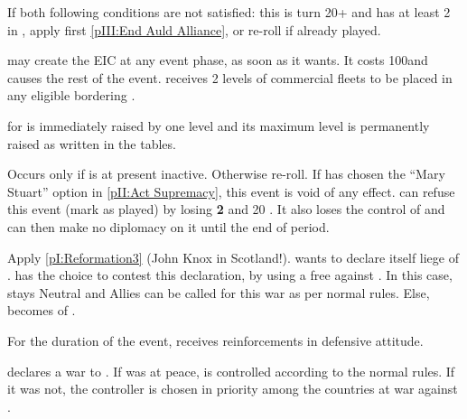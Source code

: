 

\condition{}
\aparag If both following conditions are not satisfied: this is turn 20+ and
\ENG has at least 2 \TP in , apply first \ref{pIII:End Auld
  Alliance}, or re-roll if already played.

\phevnt
\aparag \ENG may create the EIC at any event phase, as soon as it wants. It
costs 100\ducats and causes the rest of the event.
\aparag \ENG receives 2 levels of commercial fleets to be placed in any
eligible \STZ bordering .

\effetlong
\aparag \FTI for \ENG is immediately raised by one level and its maximum level
is permanently raised as written in the tables.





\condition{}
\aparag Occurs only if \paysecosse is at present inactive. Otherwise re-roll.
\aparag If \ANG has chosen the ``Mary Stuart'' option in \ref{pII:Act
  Supremacy}, this event is void of any effect.
\aparag \ENG can refuse this event (mark as played) by losing {\bf 2} \STAB
and 20 \VP. It also loses the control of \paysecosse and can then make no
diplomacy on it until the end of period.

\phevnt
\aparag Apply \ref{pI:Reformation3} (John Knox in Scotland!).
\aparag \paysecosse wants to declare itself liege of \FRA.  \ENG has the
choice to contest this declaration, by using a free \CB against \paysecosse.
In this case, \paysecosse stays Neutral and Allies can be called for this war
as per normal rules. Else, \paysecosse becomes \VASSAL of \FRA.

\phadm
\aparag For the duration of the event, \paysecosse receives reinforcements in
defensive attitude.






\phevnt
\aparag \paysDanemark declares a war to \SUE. If \SUE was at peace,
\paysDanemark is controlled according to the normal rules. If it was not, the
controller is chosen in priority among the countries at war against \SUE.

